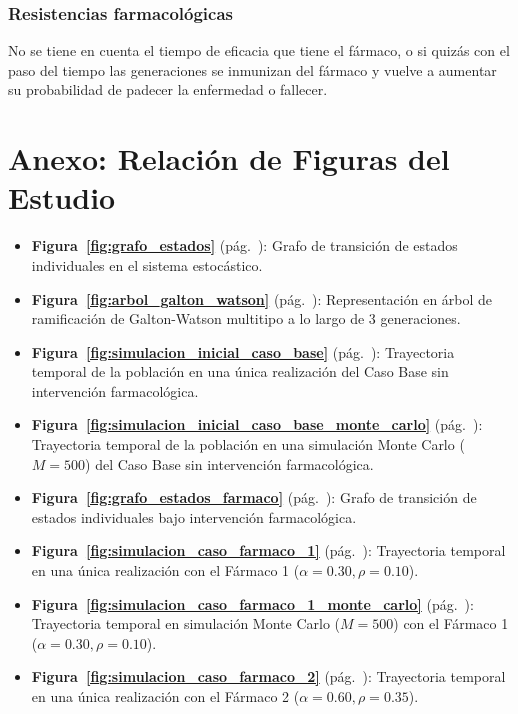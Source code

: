 \documentclass[graybox]{SNmult}
\begin{document}
	\subsubsection{Resistencias farmacológicas}
	No se tiene en cuenta el tiempo de eficacia que tiene el fármaco, o si quizás con el paso del tiempo las generaciones se inmunizan del fármaco y vuelve a aumentar su probabilidad de padecer la enfermedad o fallecer. 
	

\clearpage
\appendix
\section*{Anexo: Relación de Figuras del Estudio}
\label{sec:anexo}

\begin{itemize}
	\item \textbf{Figura~\ref{fig:grafo_estados}} (pág.~\pageref{fig:grafo_estados}): Grafo de transición de estados individuales en el sistema estocástico.
	\item \textbf{Figura~\ref{fig:arbol_galton_watson}} (pág.~\pageref{fig:arbol_galton_watson}): Representación en árbol de ramificación de Galton-Watson multitipo a lo largo de 3 generaciones.
	\item \textbf{Figura~\ref{fig:simulacion_inicial_caso_base}} (pág.~\pageref{fig:simulacion_inicial_caso_base}): Trayectoria temporal de la población en una única realización del Caso Base sin intervención farmacológica.
	\item \textbf{Figura~\ref{fig:simulacion_inicial_caso_base_monte_carlo}} (pág.~\pageref{fig:simulacion_inicial_caso_base_monte_carlo}): Trayectoria temporal de la población en una simulación Monte Carlo ($M=500$) del Caso Base sin intervención farmacológica.
	\item \textbf{Figura~\ref{fig:grafo_estados_farmaco}} (pág.~\pageref{fig:grafo_estados_farmaco}): Grafo de transición de estados individuales bajo intervención farmacológica.
	\item \textbf{Figura~\ref{fig:simulacion_caso_farmaco_1}} (pág.~\pageref{fig:simulacion_caso_farmaco_1}): Trayectoria temporal en una única realización con el Fármaco 1 ($\alpha=0.30, \rho=0.10$).
	\item \textbf{Figura~\ref{fig:simulacion_caso_farmaco_1_monte_carlo}} (pág.~\pageref{fig:simulacion_caso_farmaco_1_monte_carlo}): Trayectoria temporal en simulación Monte Carlo ($M=500$) con el Fármaco 1 ($\alpha=0.30, \rho=0.10$).
	\item \textbf{Figura~\ref{fig:simulacion_caso_farmaco_2}} (pág.~\pageref{fig:simulacion_caso_farmaco_2}): Trayectoria temporal en una única realización con el Fármaco 2 ($\alpha=0.60, \rho=0.35$).

\end{itemize}
\end{document}
